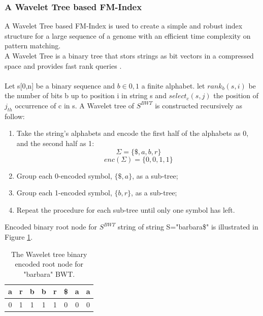 \documentclass[11pt,a4paper]{report}
\begin{document}

\subsubsection{A Wavelet Tree based FM-Index}
\label{A Wavelet Tree based FM-Index}


A Wavelet Tree based FM-Index is used to create a simple and robust 
index structure for a large sequence of a genome with an efficient
time complexity on pattern matching.\\
A Wavelet Tree is a binary tree that stors strings as bit vectors in a 
compressed space and provides fast rank queries \cite{navarroWavelet}
\cite{Wavthesis}\cite{AlexBowe}.\\\\
Let s[0,n] be a binary sequence and $b \in {0,1}$ a finite alphabet. 
let $ rank_{b}(s,i)$ be the number of bits b up to position i in string s 
and $ select_{c}(s,j)$  the position of $j_{th}$ occurrence of c in s.
A Wavelet tree of $S^{BWT}$ is constructed recursively as follow:
\begin{enumerate}
    \item
		Take the string's alphabets and encode the first half of the 
		alphabets as 0, and the second half as 1\cite {AlexBowe}:
    		$$\Sigma = \{ \$, a, b, r \}$$
			$$enc(\Sigma) = \{ 0, 0, 1, 1 \}$$
    \item
		Group each 0-encoded symbol, $\{ \$, a \}$, as a sub-tree;
    \item
		Group each 1-encoded symbol, $\{ b , r\}$, as a sub-tree;
    \item
		Repeat the procedure for each sub-tree until only one symbol has left.
\end{enumerate}

Encoded binary root node for $S^{BWT}$ string of string S="barbara\$" 
is illustrated in Figure \ref{binary-root}.
			\begin{table}[h]
			\centering
			  \begin{tabular}{ c c c c c c c c}
				   a  & r & b & b & r & \$ & a & a \\ 
				  \hline
				   0 &	1 &	1 & 1 & 1 & 0 & 0 & 0\\  
				  \hline
			  \end{tabular}
			\caption{The Wavelet tree binary encoded root node for "barbara" BWT.}
			\label{binary-root}
			\end{table}
\end{document}
